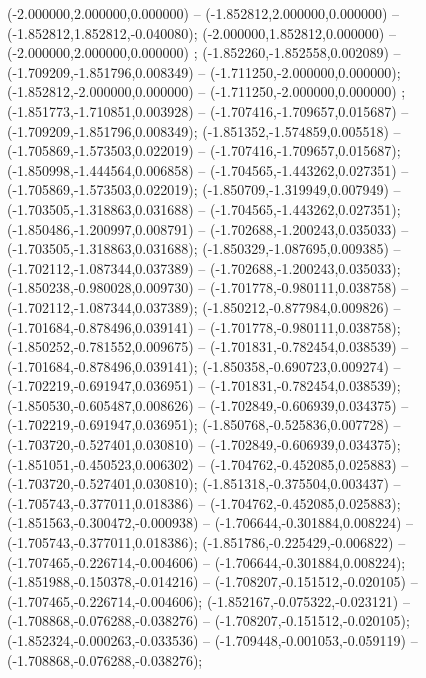  (-2.000000,2.000000,0.000000) -- (-1.852812,2.000000,0.000000) -- (-1.852812,1.852812,-0.040080);
 (-2.000000,1.852812,0.000000) -- (-2.000000,2.000000,0.000000) ;
 (-1.852260,-1.852558,0.002089) -- (-1.709209,-1.851796,0.008349) -- (-1.711250,-2.000000,0.000000);
 (-1.852812,-2.000000,0.000000) -- (-1.711250,-2.000000,0.000000) ;
 (-1.851773,-1.710851,0.003928) -- (-1.707416,-1.709657,0.015687) -- (-1.709209,-1.851796,0.008349);
 (-1.851352,-1.574859,0.005518) -- (-1.705869,-1.573503,0.022019) -- (-1.707416,-1.709657,0.015687);
 (-1.850998,-1.444564,0.006858) -- (-1.704565,-1.443262,0.027351) -- (-1.705869,-1.573503,0.022019);
 (-1.850709,-1.319949,0.007949) -- (-1.703505,-1.318863,0.031688) -- (-1.704565,-1.443262,0.027351);
 (-1.850486,-1.200997,0.008791) -- (-1.702688,-1.200243,0.035033) -- (-1.703505,-1.318863,0.031688);
 (-1.850329,-1.087695,0.009385) -- (-1.702112,-1.087344,0.037389) -- (-1.702688,-1.200243,0.035033);
 (-1.850238,-0.980028,0.009730) -- (-1.701778,-0.980111,0.038758) -- (-1.702112,-1.087344,0.037389);
 (-1.850212,-0.877984,0.009826) -- (-1.701684,-0.878496,0.039141) -- (-1.701778,-0.980111,0.038758);
 (-1.850252,-0.781552,0.009675) -- (-1.701831,-0.782454,0.038539) -- (-1.701684,-0.878496,0.039141);
 (-1.850358,-0.690723,0.009274) -- (-1.702219,-0.691947,0.036951) -- (-1.701831,-0.782454,0.038539);
 (-1.850530,-0.605487,0.008626) -- (-1.702849,-0.606939,0.034375) -- (-1.702219,-0.691947,0.036951);
 (-1.850768,-0.525836,0.007728) -- (-1.703720,-0.527401,0.030810) -- (-1.702849,-0.606939,0.034375);
 (-1.851051,-0.450523,0.006302) -- (-1.704762,-0.452085,0.025883) -- (-1.703720,-0.527401,0.030810);
 (-1.851318,-0.375504,0.003437) -- (-1.705743,-0.377011,0.018386) -- (-1.704762,-0.452085,0.025883);
 (-1.851563,-0.300472,-0.000938) -- (-1.706644,-0.301884,0.008224) -- (-1.705743,-0.377011,0.018386);
 (-1.851786,-0.225429,-0.006822) -- (-1.707465,-0.226714,-0.004606) -- (-1.706644,-0.301884,0.008224);
 (-1.851988,-0.150378,-0.014216) -- (-1.708207,-0.151512,-0.020105) -- (-1.707465,-0.226714,-0.004606);
 (-1.852167,-0.075322,-0.023121) -- (-1.708868,-0.076288,-0.038276) -- (-1.708207,-0.151512,-0.020105);
 (-1.852324,-0.000263,-0.033536) -- (-1.709448,-0.001053,-0.059119) -- (-1.708868,-0.076288,-0.038276);
